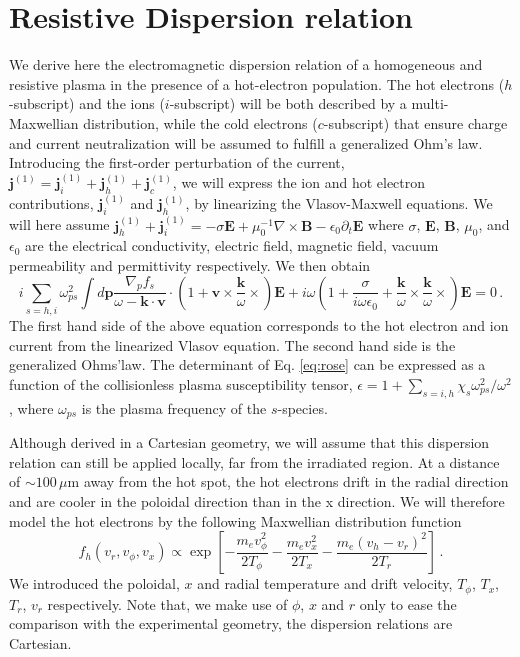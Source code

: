 \documentclass[aps,showpacs,superscriptaddress]{revtex4}
\begin{document}
\section{Resistive Dispersion relation}
We derive here the electromagnetic dispersion relation of a homogeneous and resistive plasma in the presence of a hot-electron population. The hot electrons ($h$-subscript) and the ions ($i$-subscript) will be both  described by a multi-Maxwellian distribution, while the cold electrons ($c$-subscript) that ensure charge and current neutralization will be assumed to fulfill a generalized Ohm's law. Introducing the first-order perturbation of the  current, $\mathbf{j}^{(1)} = \mathbf{j}_i^{(1)} +\mathbf{j}_h^{(1)}+\mathbf{j}_c^{(1)}$, we will express the ion and hot electron contributions, $\mathbf{j}_i^{(1)}$ and $\mathbf{j}_h^{(1)}$, by linearizing the Vlasov-Maxwell equations.
We will here assume  $\mathbf{j}_h^{(1)} +\mathbf{j}_i^{(1)} =- \sigma \mathbf{E} +\mu_0^{-1}\nabla \times \mathbf{B} - \epsilon_0 \partial_t \mathbf{E}$ where $\sigma$, $\mathbf{E}$, $\mathbf{B}$, $\mu_0$, and $\epsilon_0$ are the electrical conductivity,  electric field, magnetic field, vacuum permeability and permittivity respectively.
We then obtain 
\begin{equation}\label{eq:rose}
i \sum_{s =h,i} \omega_{ps}^2 \int d\mathbf{p} \frac{\nabla_pf_s}{\omega -\mathbf{k}\cdot\mathbf{v}}\cdot \left( 1 +\mathbf{v}\times \frac{\mathbf{k}}{\omega} \times \right)\mathbf{E}
+ i\omega \left( 1 + \frac{\sigma }{i\omega \epsilon_0}+ \frac{\mathbf{k}}{\omega}\times \frac{\mathbf{k}}{\omega} \times \right)\mathbf{E} =0 \, .
\end{equation}
The first hand side of the above equation corresponds to the hot electron and ion current from the linearized Vlasov equation. The second hand side is the generalized Ohms'law.
The determinant of Eq. \eqref{eq:rose} can be expressed as a function of the  collisionless  plasma susceptibility tensor, $\epsilon =  1 + \sum_{s = i,h} \chi_s\omega_{ps}^2/\omega^2$, where $\omega_{ps}$ is the plasma frequency of the $s$-species.

Although  derived in a Cartesian geometry, we will assume that this dispersion relation can still be applied locally, far from the irradiated region. At a distance of $\sim 100\, \mu$m away from the hot spot, the hot electrons drift in the radial direction and are cooler in the poloidal direction than in the x direction. We will therefore model the hot electrons by the following Maxwellian distribution function 
\begin{equation}\label{eq:distrib}
f_h(v_r, v_\phi,v_x) \propto \exp\left[ -\frac{m_ev_\phi^2}{2T_\phi} -\frac{m_ev_x^2}{2T_x} -\frac{m_e(v_h-v_r)^2}{2T_r} \right]\, .
\end{equation}
We introduced the poloidal, $x$ and radial temperature and drift velocity, $T_\phi$, $T_x$, $T_r$, $v_r$ respectively. 
Note that, we make use of  $\phi$, $x$ and $r$ only to ease the comparison with the experimental geometry, the dispersion relations are Cartesian.
\end{document}

